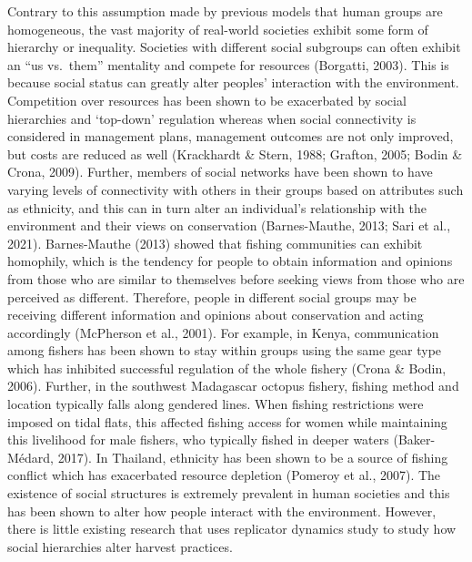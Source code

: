 \documentclass[
  12pt,
]{article}
\begin{document}
Contrary to this assumption made by previous models that human groups are homogeneous, the vast majority of real-world societies exhibit some form of hierarchy or inequality. Societies with different social subgroups can often exhibit an ``us vs.~them'' mentality and compete for resources (Borgatti, 2003). This is because social status can greatly alter peoples' interaction with the environment. Competition over resources has been shown to be exacerbated by social hierarchies and `top-down' regulation whereas when social connectivity is considered in management plans, management outcomes are not only improved, but costs are reduced as well (Krackhardt \& Stern, 1988; Grafton, 2005; Bodin \& Crona, 2009). Further, members of social networks have been shown to have varying levels of connectivity with others in their groups based on attributes such as ethnicity, and this can in turn alter an individual's relationship with the environment and their views on conservation (Barnes-Mauthe, 2013; Sari et al., 2021). Barnes-Mauthe (2013) showed that fishing communities can exhibit homophily, which is the tendency for people to obtain information and opinions from those who are similar to themselves before seeking views from those who are perceived as different. Therefore, people in different social groups may be receiving different information and opinions about conservation and acting accordingly (McPherson et al., 2001). For example, in Kenya, communication among fishers has been shown to stay within groups using the same gear type which has inhibited successful regulation of the whole fishery (Crona \& Bodin, 2006). Further, in the southwest Madagascar octopus fishery, fishing method and location typically falls along gendered lines. When fishing restrictions were imposed on tidal flats, this affected fishing access for women while maintaining this livelihood for male fishers, who typically fished in deeper waters (Baker-Médard, 2017). In Thailand, ethnicity has been shown to be a source of fishing conflict which has exacerbated resource depletion (Pomeroy et al., 2007). The existence of social structures is extremely prevalent in human societies and this has been shown to alter how people interact with the environment. However, there is little existing research that uses replicator dynamics study to study how social hierarchies alter harvest practices.
\end{document}
